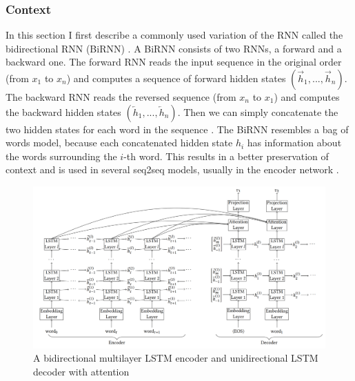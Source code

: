 \documentclass[12pt]{article}
\begin{document}
\subsubsection{Context} \label{sssec:context}
In this section I first describe a commonly used variation of the RNN called the bidirectional RNN (BiRNN) \cite{Schuster:1997}. A BiRNN consists of two RNNs, a forward and a backward one. The forward RNN reads the input sequence in the original order (from \(x_1\) to \(x_n\)) and computes a sequence of forward hidden states \((\overrightarrow{h}_1,...,\overrightarrow{h}_n)\). The backward RNN reads the reversed sequence (from \(x_n\) to \(x_1\)) and computes the backward hidden states \((\overleftarrow{h}_1,...,\overleftarrow{h}_n)\). Then we can simply concatenate the two hidden states for each word in the sequence \cite{Bahdanau:2014,Zhaob:2017}. The BiRNN resembles a bag of words model, because each concatenated hidden state \(h_i\) has information about the words surrounding the \(i\)-th word. This results in a better preservation of context and is used in several seq2seq models, usually in the encoder network \cite{Zhaob:2017,Xing_topic:2017,googleNMT:2016,Yin:2017}.
\begin{figure}[H]
	\label{fig:context}
	\centering
	\includegraphics[width=1.0\textwidth]{pics/bilstm.png}
	\caption{A bidirectional multilayer LSTM encoder and unidirectional LSTM decoder with attention \cite{Yin:2017}}
\end{figure}
\end{document}

